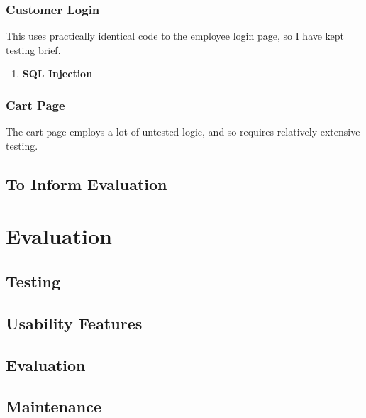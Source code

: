 ﻿\documentclass{article}
\begin{document}
    \subsubsection{Customer Login}
    This uses practically identical code to the employee login page, so I have kept testing brief.
    \begin{enumerate}
        \item \textbf{SQL Injection}
    \end{enumerate}
    \subsubsection{Cart Page}
    The cart page employs a lot of untested logic, and so requires relatively extensive testing.
    \subsection{To Inform Evaluation}
    
    
    \section{Evaluation}
    \subsection{Testing}
    \subsection{Usability Features}
    \subsection{Evaluation}
    \subsection{Maintenance}
\end{document}

